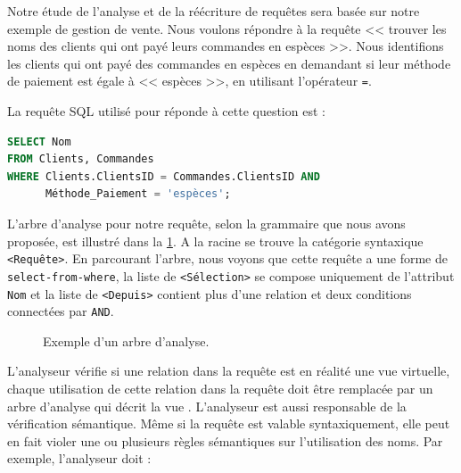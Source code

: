 \begin{example}\label{ex:parser-tree}
Notre étude de l'analyse et de la réécriture de requêtes sera basée sur notre exemple de gestion de vente. Nous voulons répondre à la requête << trouver les noms des clients qui ont payé leurs commandes en espèces >>. Nous identifions les clients qui ont payé des commandes en espèces en demandant si leur méthode de paiement est égale à << espèces >>, en utilisant l'opérateur \texttt{=}.
\end{example}

La requête SQL utilisé pour réponde à cette question est :
\begin{lstlisting}[language=Sql]
SELECT Nom
FROM Clients, Commandes
WHERE Clients.ClientsID = Commandes.ClientsID AND
      Méthode_Paiement = 'espèces';
\end{lstlisting}

L'arbre d'analyse pour notre requête, selon la grammaire que nous avons proposée, est illustré dans la \ref{fig:parser-tree}. A la racine se trouve la catégorie syntaxique \texttt{<Requête>}. En parcourant l'arbre, nous voyons que cette requête a une forme de \texttt{select-from-where}, la liste de \texttt{<Sélection>} se compose uniquement de l'attribut \texttt{Nom} et la liste de \texttt{<Depuis>} contient plus d'une relation et deux conditions connectées par \texttt{AND}.

\begin{figure}
\scriptsize
\begin{center}

\caption{Exemple d'un arbre d'analyse.}
\label{fig:parser-tree}
\end{center}
\end{figure}

L'analyseur vérifie si une relation dans la requête est en réalité une vue virtuelle, chaque utilisation de cette relation dans la requête doit être remplacée par un arbre d'analyse qui décrit la vue \cite{GarciaMolina08}.
L'analyseur est aussi responsable de la vérification sémantique. Même si la requête est valable syntaxiquement, elle peut en fait violer une ou plusieurs règles sémantiques sur l'utilisation des noms. Par exemple, l'analyseur doit :

